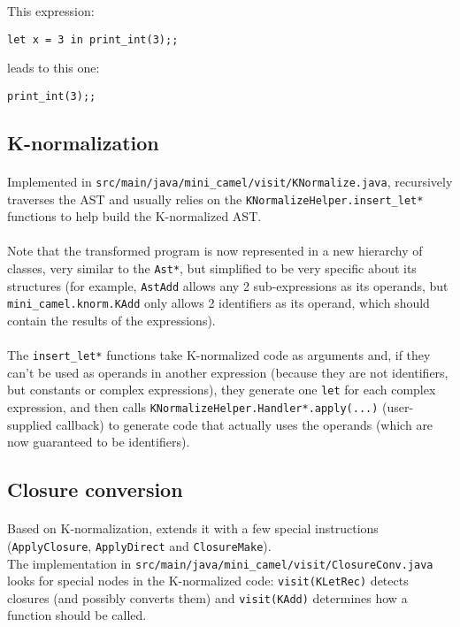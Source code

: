\documentclass[a4paper,10pt]{article}
\begin{document}
This expression: 
\begin{lstlisting}[language=caml]
	let x = 3 in print_int(3);;
	\end{lstlisting}
    
leads to this one:
\begin{lstlisting}[language=caml]
	print_int(3);;
	\end{lstlisting}


\subsection{K-normalization}
\paragraph{}
	Implemented in \texttt{src/main/java/mini\_camel/visit/KNormalize.java}, recursively traverses the AST and usually relies on the \texttt{KNormalizeHelper.insert\_let*} functions to help build the K-normalized AST.
    
\paragraph{}
	Note that the transformed program is now represented in a new hierarchy of classes, very similar to the \texttt{Ast*}, but simplified to be very specific about its structures (for example, \texttt{AstAdd} allows any 2 sub-expressions as its operands, but \texttt{mini\_camel.knorm.KAdd} only allows 2 identifiers as its operand, which should contain the results of the expressions).

\paragraph{}
	The \texttt{insert\_let*} functions take K-normalized code as arguments and, if they can't be used as operands in another expression (because they are not identifiers, but constants or complex expressions), they generate one \texttt{let} for each complex expression, and then calls \texttt{KNormalizeHelper.Handler*.apply(...)} (user-supplied callback) to generate code that actually uses the operands (which are now guaranteed to be identifiers).
    
\subsection{Closure conversion}
\paragraph{}
	Based on K-normalization, extends it with a few special instructions (\texttt{ApplyClosure}, \texttt{ApplyDirect} and \texttt{ClosureMake}).\\The implementation in \texttt{src/main/java/mini\_camel/visit/ClosureConv.java} looks for special nodes in the K-normalized code: \texttt{visit(KLetRec)} detects closures (and possibly converts them) and \texttt{visit(KAdd)} determines how a function should be called.
\end{document}
